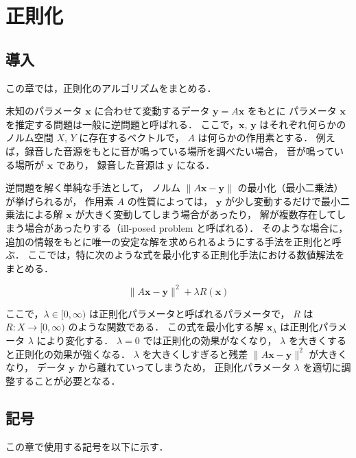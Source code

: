 %

\part{正則化}

\chapter{導入}

この章では，正則化のアルゴリズムをまとめる．

未知のパラメータ $\bm{x}$ に合わせて変動するデータ $\bm{y} = A \bm{x}$ をもとに
パラメータ $\bm{x}$ を推定する問題は一般に逆問題と呼ばれる．
ここで，$\bm{x}$, $\bm{y}$ はそれぞれ何らかのノルム空間 $X$, $Y$ に存在するベクトルで，
$A$ は何らかの作用素とする．
例えば，録音した音源をもとに音が鳴っている場所を調べたい場合，
音が鳴っている場所が $\bm{x}$ であり，
録音した音源は $\bm{y}$ になる．

逆問題を解く単純な手法として，
ノルム $\|A \bm{x} - \bm{y}\|$ の最小化（最小二乗法）が挙げられるが，
作用素 $A$ の性質によっては，
$\bm{y}$ が少し変動するだけで最小二乗法による解 $\bm{x}$ が大きく変動してしまう場合があったり，
解が複数存在してしまう場合があったりする（ill-posed problem と呼ばれる）．
そのような場合に，追加の情報をもとに唯一の安定な解を求められるようにする手法を正則化と呼ぶ．
ここでは，特に次のような式を最小化する正則化手法における数値解法をまとめる．

\begin{equation}
    \|A \bm{x} - \bm{y}\|^2 + \lambda R(\bm{x})
    \label{eq:regularization_intro_general-regularization}
\end{equation}

ここで，$\lambda \in [0, \infty)$ は正則化パラメータと呼ばれるパラメータで，
$R$ は $R : X \to [0, \infty)$ のような関数である．
この式を最小化する解 $\bm{x}_{\lambda}$ は正則化パラメータ $\lambda$ により変化する．
$\lambda = 0$ では正則化の効果がなくなり，
$\lambda$ を大きくすると正則化の効果が強くなる．
$\lambda$ を大きくしすぎると残差 $\|A \bm{x} - \bm{y}\|^2$ が大きくなり，
データ $\bm{y}$ から離れていってしまうため，
正則化パラメータ $\lambda$ を適切に調整することが必要となる．

\chapter{記号}

この章で使用する記号を以下に示す．

